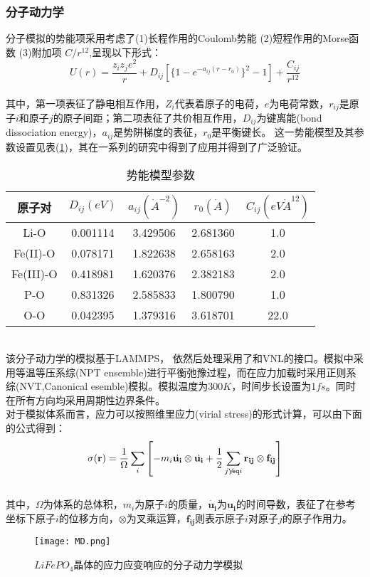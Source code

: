 \subsubsection*{分子动力学}
分子模拟的势能项采用考虑了(1)长程作用的Coulomb势能 (2)短程作用的Morse函数 (3)附加项 $C/r^{12}$,呈现以下形式\cite{Alfonso2006A}：
\begin{equation}
\label{eq:MD}
U(r) = \frac{z_i z_j e^2}{r} +D_{ij} \left[\{1-e^{-a_{ij}(r-r_0)}\}^2 -1 \right] + \frac{C_{ij}}{r^{12}}
\end{equation}
\\
其中，第一项表征了静电相互作用，$Z_i$代表着原子的电荷，$e$为电荷常数，$r_{ij}$是原子$i$和原子$j$的原子间距；第二项表征了共价相互作用，$D_{ij}$为键离能(bond dissociation energy)，$a_{ij}$是势阱梯度的表征，$r_0$是平衡键长。 这一势能模型及其参数设置见表(\ref{tab:md})，其在一系列的研究中得到了应用并得到了广泛验证。
\begin{table}[!htbp]
\centering
\caption{势能模型参数}\label{tab:md}%
\begin{tabular}{ccccc}
\toprule
原子对 & $D_{ij}(eV)$ & $a_{ij}(\dot{A}^{-2})$ & $r_0(\dot{A})$ & $C_{ij} (eV \dot{A}^{12})$ \\
\midrule
Li-O & 0.001114 & 3.429506 &2.681360 & 1.0 \\
Fe(II)-O & 0.078171 & 1.822638 & 2.658163 & 2.0 \\
Fe(III)-O & 0.418981 & 1.620376 & 2.382183 & 2.0 \\
P-O & 0.831326 & 2.585833 & 1.800790&1.0\\
O-O & 0.042395 & 1.379316 & 3.618701 & 22.0\\
\bottomrule
\end{tabular}
\end{table}
\\
\indent 该分子动力学的模拟基于LAMMPS\cite{Plimpton1995Fast}， 依然后处理采用了和VNL的接口。模拟中采用等温等压系综(NPT ensemble)进行平衡弛豫过程，而在应力加载时采用正则系综(NVT,Canonical esemble)模拟。模拟温度为300$K$，时间步长设置为1$fs$。同时在所有方向均采用周期性边界条件。
\\
\indent 对于模拟体系而言，应力可以按照维里应力(virial stress)的形式计算，可以由下面的公式得到：
\begin{equation}
\sigma(\mathbf{r}) = \frac{1}{\Omega} \sum_i \left[ -m_i \dot{\mathbf{u_i}} \otimes \dot{\mathbf{u_i}} + \frac{1}{2} \sum_{j \not\eq i} \mathbf{r_{ij}} \otimes \mathbf{f_{ij}} \right]
\end{equation}
\\
\indent 其中，$\Omega$为体系的总体积，$m_i$为原子$i$的质量，$\dot{\mathbf{u_i}}$为$\mathbf{u_i}$的时间导数，表征了在参考坐标下原子$i$的位移方向，$\otimes$为叉乘运算，$\mathbf{f_{ij}}$则表示原子$i$对原子$j$的原子作用力。
\begin{figure}
	\centering   
	\texttt{[image: MD.png]}
	\caption{$LiFePO_4$晶体的应力应变响应的分子动力学模拟} 
	\label{fig:md}
\end{figure}
